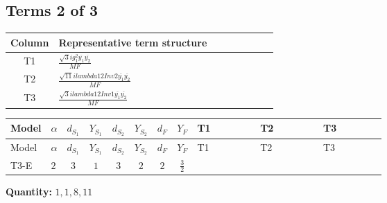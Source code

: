 \documentclass[8pt]{article}
\begin{document}
\begin{landscape}
\subsection*{Terms 2 of 3}
\begin{center}
\begin{tabular}{@{}c >{\raggedright\arraybackslash}p{0.82\linewidth}@{}}
\toprule
Column & Representative term structure \\
\midrule
T1 & \(\displaystyle \frac{\sqrt{3} i g_{1}^{2} \overline{y_{1}} \overline{y_{2}}}{MF}\) \\
\midrule
T2 & \(\displaystyle \frac{\sqrt{11} i lambda12Inv2 \overline{y_{1}} \overline{y_{2}}}{MF}\) \\
\midrule
T3 & \(\displaystyle \frac{\sqrt{3} i lambda12Inv1 \overline{y_{1}} \overline{y_{2}}}{MF}\) \\
\midrule
\bottomrule
\end{tabular}
\end{center}
\smallskip
\tiny
\begin{longtable}{@{}llcccccc >{\raggedright\arraybackslash}p{0.21\linewidth} >{\raggedright\arraybackslash}p{0.21\linewidth} >{\raggedright\arraybackslash}p{0.21\linewidth}@{}}
\toprule
Model & $\alpha$ & $d_{S_1}$ & $Y_{S_1}$ & $d_{S_2}$ & $Y_{S_2}$ & $d_F$ & $Y_F$ & T1 & T2 & T3 \\
\midrule
\endfirsthead
\toprule
Model & $\alpha$ & $d_{S_1}$ & $Y_{S_1}$ & $d_{S_2}$ & $Y_{S_2}$ & $d_F$ & $Y_F$ & T1 & T2 & T3 \\
\midrule
\endhead
T3-E & $2$ & $3$ & $1$ & $3$ & $2$ & $2$ & $\frac{3}{2}$ & \scriptsize\adjustbox{max width=\linewidth}{$\begin{gathered} - \frac{9 \sqrt{3} i g_{1}^{2} \overline{y_{1}} \overline{y_{2}}}{8 MF}\end{gathered}$} & \scriptsize\adjustbox{max width=\linewidth}{$\begin{gathered} - \frac{3 \sqrt{11} i lambda12Inv2 \overline{y_{1}} \overline{y_{2}}}{22 MF}\end{gathered}$} & \scriptsize\adjustbox{max width=\linewidth}{$\begin{gathered} \frac{\sqrt{3} i lambda12Inv1 \overline{y_{1}} \overline{y_{2}}}{6 MF}\end{gathered}$} \\
\midrule
\bottomrule
\end{longtable}
\clearpage
\noindent\textbf{Quantity: }$\mathrm{1,1,8,11}$\par\smallskip

\end{landscape}
\end{document}
